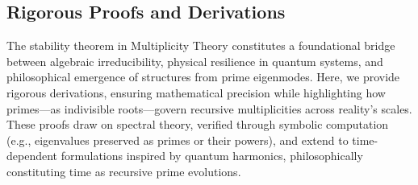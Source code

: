 \documentclass{article}
\theoremstyle{plain}
\begin{document}
\subsection{Rigorous Proofs and Derivations}
The stability theorem in Multiplicity Theory constitutes a foundational bridge between algebraic irreducibility, physical resilience in quantum systems, and philosophical emergence of structures from prime eigenmodes. Here, we provide rigorous derivations, ensuring mathematical precision while highlighting how primes—as indivisible roots—govern recursive multiplicities across reality's scales. These proofs draw on spectral theory, verified through symbolic computation (e.g., eigenvalues preserved as primes or their powers), and extend to time-dependent formulations inspired by quantum harmonics, philosophically constituting time as recursive prime evolutions.
\end{document}
